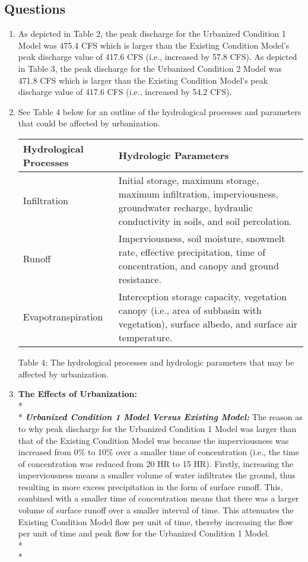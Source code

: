 \documentclass[]{article}
\begin{document}
\subsection{Questions}
\vspace{0.5 cm}
\begin{enumerate}[label=\textbf{\arabic*.}] 
	\item As depicted in Table 2, the peak discharge for the Urbanized Condition 1 Model was 475.4 CFS which is larger than the Existing Condition Model's peak discharge value of 417.6 CFS (i.e., increased by 57.8 CFS). As depicted in Table 3, the peak discharge for the Urbanized Condition 2 Model was 471.8 CFS which is larger than the Existing Condition Model's peak discharge value of 417.6 CFS (i.e., increased by 54.2 CFS). \\ 
	\item See Table 4 below for an outline of the hydrological processes and parameters that could be affected by urbanization. \vspace{0.5 cm}
	\begin{center}
		\begin{tabular}{|M{4cm}|M{10cm}|}
			\hline
			Hydrological Processes & Hydrologic Parameters \\ \hline
			Infiltration  & Initial storage, maximum storage, maximum infiltration, imperviousness, groundwater recharge, hydraulic conductivity in soils, and soil percolation.   \\ \hline
			Runoff &  Imperviousness, soil moisture, snowmelt rate, effective precipitation, time of concentration, and canopy and ground resistance.  \\ \hline
			Evapotranspiration & Interception storage capacity, vegetation canopy (i.e., area of subbasin with vegetation), surface albedo, and surface air temperature. \\ \hline 
		\end{tabular} 
	\end{center} 
	\begin{center} 
		Table 4: The hydrological processes and hydrologic parameters that may be affected by urbanization.
	\end{center} 
	\newpage 
	\item \textbf{The Effects of Urbanization:} \\* \\* 
	\textit{\textbf{Urbanized Condition 1 Model Versus Existing Model:}} The reason as to why peak discharge for the Urbanized Condition 1 Model was larger than that of the Existing Condition Model was because the imperviousness was increased from 0\% to 10\% over a smaller time of concentration (i.e., the time of concentration was reduced from 20 HR to 15 HR). Firstly, increasing the imperviousness means a smaller volume of water infiltrates the ground, thus resulting in more excess precipitation in the form of surface runoff. This, combined with a smaller time of concentration means that there was a larger volume of surface runoff over a smaller interval of time. This attenuates the Existing Condition Model flow per unit of time, thereby increasing the flow per unit of time and peak flow for the Urbanized Condition 1 Model.\\* \\* 

\end{enumerate}
\end{document}
